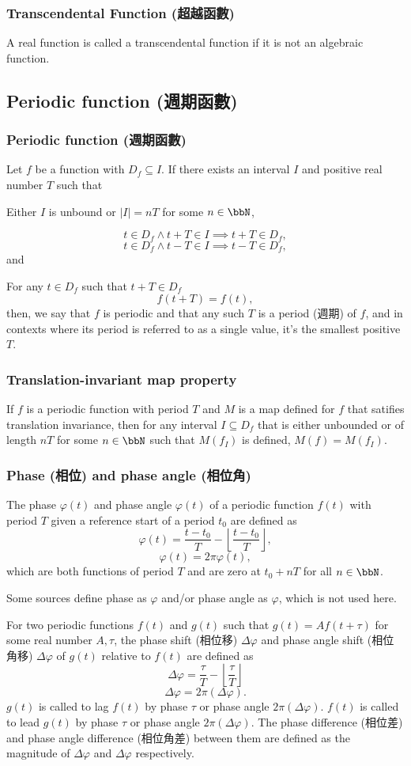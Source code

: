 \documentclass[a4paper,12pt]{report}
\begin{document}
\subsubsection{Transcendental Function (超越函數)}
A real function is called a transcendental function if it is not an algebraic function.
\subsection{Periodic function (週期函數)}
\subsubsection{Periodic function (週期函數)}
Let $f$ be a function with $D_f\subseteq I$. If there exists an interval $I$ and positive real number $T$ such that
\bit
\item Either $I$ is unbound or $|I|=nT$ for some $n\in\bbN$,
\item
\[t\in D_f\land t+T\in I\implies t+T\in D_f,\]
\[t\in D_f\land t-T\in I \implies t-T\in D_f,\]
and
\item For any $t\in D_f$ such that $t+T\in D_f$
\[f(t+T)=f(t),\]
\eit
then, we say that $f$ is periodic and that any such $T$ is a period (週期) of $f$, and in contexts where its period is referred to as a single value, it's the smallest positive $T$.
\subsubsection{Translation-invariant map property}
If $f$ is a periodic function with period $T$ and $M$ is a map defined for $f$ that satifies translation invariance, then for any interval $I\subseteq D_f$ that is either unbounded or of length $nT$ for some $n\in\bbN$ such that $M(f_I)$ is defined, $M(f)=M(f_I)$.
\subsubsection{Phase (相位) and phase angle (相位角)}
The phase $\varphi(t)$ and phase angle $\varphi(t)$ of a periodic function $f(t)$ with period $T$ given a reference start of a period $t_0$ are defined as
\[\varphi(t)=\frac{t-t_0}{T}-\left\lfloor\frac{t-t_0}{T}\right\rfloor,\]
\[\varphi(t)=2\pi\varphi(t),\]
which are both functions of period $T$ and are zero at $t_0+nT$ for all $n\in\bbN$.

Some sources define phase as $\varphi$ and/or phase angle as $\varphi$, which is not used here.

For two periodic functions $f(t)$ and $g(t)$ such that $g(t)=Af(t+\tau)$ for some real number $A,\tau$, the phase shift (相位移) $\Delta\varphi$ and phase angle shift (相位角移) $\Delta\varphi$ of $g(t)$ relative to $f(t)$ are defined as
\[\Delta\varphi=\frac{\tau}{T}-\left\lfloor\frac{\tau}{T}\right\rfloor\]
\[\Delta\varphi=2\pi(\Delta\varphi).\]
$g(t)$ is called to lag $f(t)$ by phase $\tau$ or phase angle $2\pi(\Delta\varphi)$. $f(t)$ is called to lead $g(t)$ by phase $\tau$ or phase angle $2\pi(\Delta\varphi)$. The phase difference (相位差) and phase angle difference (相位角差) between them are defined as the magnitude of $\Delta\varphi$ and $\Delta\varphi$ respectively.
\end{document}
